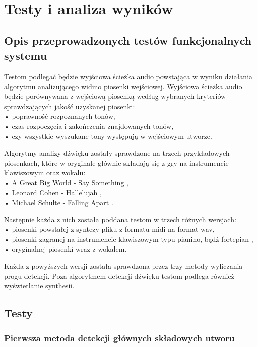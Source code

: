 \chapter{Testy i analiza wyników}
\vspace{-25pt}
\section{ Opis przeprowadzonych testów funkcjonalnych systemu}
Testom podlegać będzie wyjściowa ścieżka audio powstająca w wyniku działania algorytmu analizującego widmo piosenki wejściowej. Wyjściowa ścieżka audio będzie porównywana z wejściową piosenką według wybranych kryteriów sprawdzających jakość uzyskanej piosenki:\\
• poprawność rozpoznanych tonów,\\
• czas rozpoczęcia i zakończenia znajdowanych tonów,\\
• czy wszystkie wyszukane tony występują w wejściowym utworze.

Algorytmy analizy dźwięku zostały sprawdzone na trzech przykładowych piosenkach, które w oryginale głównie składają się z gry na instrumencie klawiszowym oraz wokalu:\\
• A Great Big World - Say Something \cite{say_something},\\
• Leonard Cohen - Hallelujah \cite{hallelujah},\\
• Michael Schulte - Falling Apart \cite{falling_apart}.

Następnie każda z nich została poddana testom w trzech różnych wersjach:\\
• piosenki powstałej z syntezy pliku z formatu midi na format wav,\\
• piosenki zagranej na instrumencie klawiszowym typu pianino, bądź fortepian \cite{say_something_piano_cover}\cite{hallelujah_piano_cover}\cite{falling_apart_piano_cover},\\
• oryginalnej piosenki wraz z wokalem.

Każda z powyższych wersji została sprawdzona przez trzy metody wyliczania progu detekcji. Poza algorytmem detekcji dźwięku testom podlega również wyświetlanie synthesii.

\newpage
\section{Testy}

\subsection{Pierwsza metoda detekcji głównych składowych utworu}

